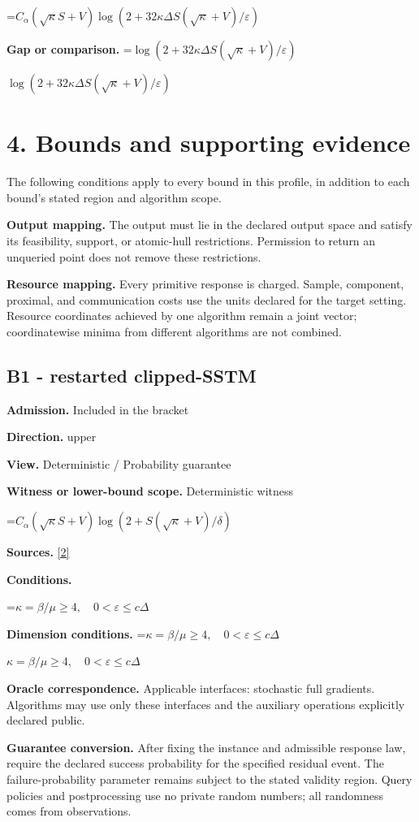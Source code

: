 \documentclass[10pt,a4paper]{article}
\newcommand{\AtlasMath}[1]{\par\begingroup\centering\setbox0=\hbox{$\displaystyle #1$}\ifdim\wd0>1.4\linewidth\typeout{ATLAS WIDE FORMULA: \the\wd0}\fi\ifdim\wd0>\linewidth\resizebox{\linewidth}{!}{\box0}\else\box0\fi\par\endgroup}
\newcommand{\AtlasInlineMath}[1]{\begingroup\setbox0=\hbox{$#1$}\ifdim\wd0>.4\linewidth\endgroup\AtlasMath{#1}\else\endgroup$#1$\fi}
\begin{document}
\AtlasMath{C_\alpha(\sqrt\kappa S+V)\log(2+32\kappa\Delta S(\sqrt\kappa+V)/\varepsilon)}
\textbf{Gap or comparison.} \AtlasInlineMath{\log(2+32\kappa\Delta S(\sqrt\kappa+V)/\varepsilon)}

\section{4. Bounds and supporting evidence}
The following conditions apply to every bound in this profile, in addition to each bound's stated region and algorithm scope.

\textbf{Output mapping.} The output must lie in the declared output space and satisfy its feasibility, support, or atomic-hull restrictions. Permission to return an unqueried point does not remove these restrictions.

\textbf{Resource mapping.} Every primitive response is charged. Sample, component, proximal, and communication costs use the units declared for the target setting. Resource coordinates achieved by one algorithm remain a joint vector; coordinatewise minima from different algorithms are not combined.

\subsection{B1 - restarted clipped-SSTM}
\textbf{Admission.} Included in the bracket

\textbf{Direction.} upper

\textbf{View.} Deterministic / Probability guarantee

\textbf{Witness or lower-bound scope.} Deterministic witness

\AtlasMath{C_\alpha(\sqrt\kappa S+V)\log(2+S(\sqrt\kappa+V)/\delta)}
\textbf{Sources.} \href{https://proceedings.mlr.press/v202/sadiev23a/sadiev23a.pdf}{[2]}

\textbf{Conditions.} 
\AtlasMath{\kappa=\beta/\mu\ge4,\quad0<\varepsilon\le c\Delta}


\textbf{Dimension conditions.} \AtlasInlineMath{\kappa=\beta/\mu\ge4,\quad0<\varepsilon\le c\Delta}

\textbf{Oracle correspondence.} Applicable interfaces: stochastic full gradients. Algorithms may use only these interfaces and the auxiliary operations explicitly declared public.

\textbf{Guarantee conversion.} After fixing the instance and admissible response law, require the declared success probability for the specified residual event. The failure-probability parameter remains subject to the stated validity region. Query policies and postprocessing use no private random numbers; all randomness comes from observations.
\end{document}
